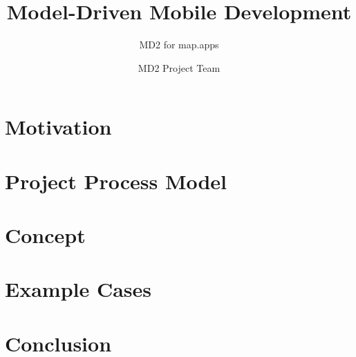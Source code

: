 \documentclass{beamer}
\author{MD2 Project Team}
\title{Model-Driven Mobile Development}
\subtitle{MD2 for map.apps}
\begin{document}
	\begin{frame}[plain]
	  \maketitle
	\end{frame}

    
    
    \section[Motivation]{Motivation}
    
    
    \section[Process]{Project Process Model}
    
    
    \section[Concept]{Concept}
    
    
    \section[Cases]{Example Cases}
       
    
    \section[Conclusion]{Conclusion}
    
\end{document}

